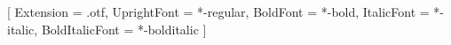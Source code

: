 
\ifsetCustomMargin
  \RequirePackage[left=37mm,right=30mm,top=35mm,bottom=30mm]{geometry}
  \setFancyHdr %
\fi

\raggedbottom



\ifsetCustomFont

  \setmainfont{texgyrepagella}[
    Extension      = .otf,
    UprightFont    = *-regular,
    BoldFont       = *-bold,
    ItalicFont     = *-italic,
    BoldItalicFont = *-bolditalic
  ]
\fi






\RequirePackage{csquotes}



